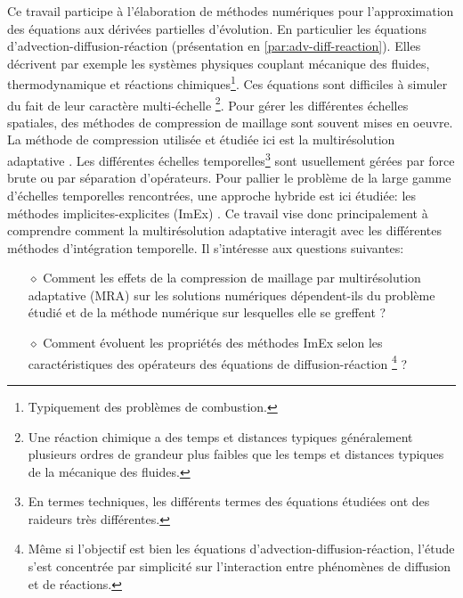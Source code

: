 Ce travail participe à l'élaboration de méthodes numériques pour l'approximation des équations aux dérivées partielles d'évolution.
En particulier les équations d'advection-diffusion-réaction (présentation en \ref{par:adv-diff-reaction}). Elles décrivent par exemple les systèmes physiques couplant
mécanique des fluides, thermodynamique et réactions chimiques\footnote{Typiquement des problèmes de combustion.}.
Ces équations sont difficiles à simuler du fait de leur caractère multi-échelle
\footnote{Une réaction chimique a des temps et distances typiques généralement plusieurs ordres de grandeur plus faibles que les temps et distances typiques de la mécanique des fluides.}.
Pour gérer les différentes échelles spatiales, des méthodes de compression de maillage sont souvent mises en oeuvre. 
La méthode de compression utilisée et étudiée ici est la multirésolution adaptative \cite{harten1994}.
Les différentes échelles temporelles\footnote{En termes techniques, les différents termes des équations étudiées ont des raideurs très différentes.}
sont usuellement gérées par force brute ou par séparation d'opérateurs. 
Pour pallier le problème de la large gamme d'échelles temporelles rencontrées, une approche hybride est ici étudiée: les méthodes implicites-explicites (ImEx) \cite{ASCHER1997151}.
Ce travail vise donc principalement à comprendre comment la multirésolution adaptative interagit avec les différentes méthodes d'intégration temporelle.
Il s'intéresse aux questions suivantes:
\begin{itemize}
\item[$\diamond$] {Comment les effets de la compression de maillage par multirésolution adaptative (MRA) sur les solutions numériques
dépendent-ils du problème étudié et de la méthode numérique sur lesquelles elle se greffent ?}
\item[$\diamond$] {Comment évoluent les propriétés des méthodes ImEx selon les caractéristiques des opérateurs des équations de diffusion-réaction}
                \footnote{Même si l'objectif est bien les équations d'advection-diffusion-réaction, l'étude s'est concentrée par simplicité sur l'interaction entre phénomènes de diffusion et de réactions.}
                { ?}
\end{itemize}